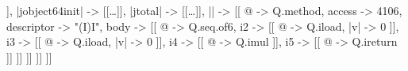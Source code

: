
\begin{phiquation*}
[[ |j\textdollar{}Numbers| -> [[
  @ -> Q.class,
  version -> 61,
  access -> 33,
  supername ->
    "java/lang/Object",
  interfaces -> [[ ]],
  |j\textdollar{}object\char64init| -> [[\dots]],
  |j\textdollar{}total| -> [[\dots]],
  || -> [[
    @ -> Q.method,
    access -> 4106,
    descriptor -> "(I)I",
    body -> [[
      @ -> Q.seq.of6,
      i2 -> [[ @ -> Q.iload, |v| -> 0 ]],
      i3 -> [[ @ -> Q.iload, |v| -> 0 ]],
      i4 -> [[ @ -> Q.imul ]],
      i5 -> [[ @ -> Q.ireturn ]] ]] ]] ]] ]]
\end{phiquation*}
